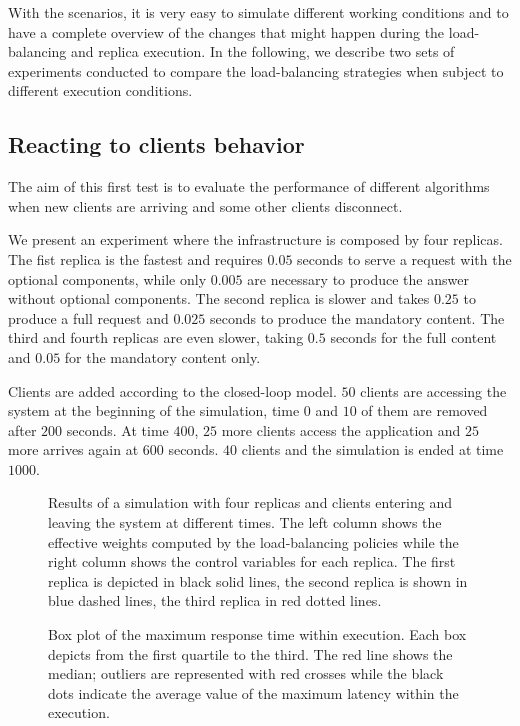 With the scenarios, it is very easy to simulate different working
conditions and to have a complete overview of the changes that might
happen during the load-balancing and replica execution. In the
following, we describe two sets of experiments conducted to compare
the load-balancing strategies when subject to different execution
conditions.

\subsection{Reacting to clients behavior}

The aim of this first test is to evaluate the performance of different
algorithms when new clients are arriving and some other clients
disconnect.

We present an experiment where the infrastructure is composed by four
replicas. The fist replica is the fastest and requires $0.05$ seconds
to serve a request with the optional components, while only $0.005$
are necessary to produce the answer without optional components. The
second replica is slower and takes $0.25$ to produce a full request
and $0.025$ seconds to produce the mandatory content. The third and
fourth replicas are even slower, taking $0.5$ seconds for the full
content and $0.05$ for the mandatory content only.

Clients are added according to the closed-loop model. $50$ clients are
accessing the system at the beginning of the simulation, time $0$ and
$10$ of them are removed after $200$ seconds. At time $400$, $25$ more
clients access the application and $25$ more arrives again at $600$
seconds.  $40$ clients and the simulation is ended at time $1000$.

\begin{figure}
  \centering 
  \caption{Results of a simulation with four replicas and clients
    entering and leaving the system at different times. The left
    column shows the effective weights computed by the load-balancing
    policies while the right column shows the control variables for
    each replica. The first replica is depicted in black solid lines,
    the second replica is shown in blue dashed lines, the third
    replica in red dotted lines.}
\label{fig:clientchanges-full}
\end{figure}

\begin{figure}
\centering

\vspace{-4mm}
\caption{Box plot of the maximum response time within execution. Each
  box depicts from the first quartile to the third. The red line shows
  the median; outliers are represented with red crosses while the
  black dots indicate the average value of the maximum latency within
  the execution.}
\label{fig:clientchanges-boxplot}
\end{figure}

